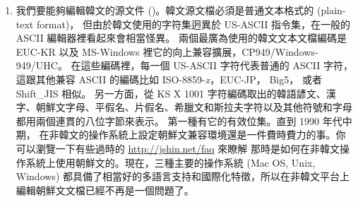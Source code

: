 \begin{enumerate}
\item
我們要能夠編輯韓文的源文件 ()。韓文源文檔必須是普通文本格式的 (plain-text format)，
但由於韓文使用的字符集迥異於 US-ASCII 指令集，在一般的 ASCII 編輯器裡看起來會相當怪異。
兩個最廣為使用的韓文文本文檔編碼是 EUC-KR 以及 MS-Windows 裡它的向上兼容擴展，CP949/Windows-949/UHC。
在這些編碼裡，每一個 US-ASCII 字符代表普通的 ASCII 字符，
這跟其他兼容 ASCII 的編碼比如 ISO-8859-\textit{x}，EUC-JP， Big5，
或者 Shift\_JIS  相似。
另一方面，從 KS X 1001 字符編碼取出的韓語諺文、漢字、朝鮮文字母、平假名、片假名、希臘文和斯拉夫字符以及其他符號和字母
都用兩個連貫的八位字節來表示。
第一種有它的有效位集。直到 1990 年代中期，
在非韓文的操作系統上設定朝鮮文兼容環境還是一件費時費力的事。你可以瀏覽一下有些過時的 \url{http://jshin.net/faq} 來瞭解
那時是如何在非韓文操作系統上使用朝鮮文的。現在，三種主要的操作系統 (Mac
OS, Unix, Windows) 
都具備了相當好的多語言支持和國際化特徵，所以在非韓文平台上編輯朝鮮文文檔已經不再是一個問題了。


\end{enumerate}
